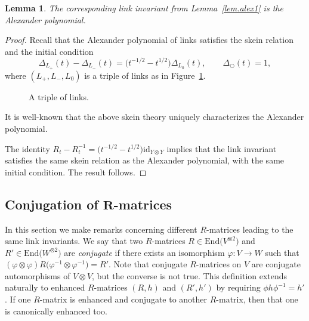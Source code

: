 \documentclass[10pt,a4paper]{amsart}
\numberwithin{equation}{section}
\newtheorem{Lemma}[Theorem]{Lemma}
\theoremstyle{definition}
\begin{document}
\begin{Lemma}\label{lem.alex2}
The corresponding link invariant from Lemma~{\rm \ref{lem.alex1}} is the
Alexander polynomial.
\end{Lemma}

\begin{proof}
Recall that the Alexander polynomial of links satisfies the
skein relation and the initial condition
\begin{equation*}
\Delta_{L_+}(t) - \Delta_{L_-}(t) = \bigl(t^{-1/2} - t^{1/2}\bigr) \Delta_{L_0}(t),
\qquad \Delta_\bigcirc(t) = 1,
\end{equation*}
where $(L_+,L_-,L_0)$ is a triple of links as in Figure~\ref{fig:skein}.

\begin{figure}[htpb!]\centering
{}
\caption{A triple of links.}
\label{fig:skein}
\end{figure}

It is well-known that the above skein theory uniquely characterizes the
Alexander polynomial.

The identity
$R_t - R_t^{-1} = \bigl(t^{-1/2} - t^{1/2}\bigr) \mathrm{id}_{Y \otimes Y}$
implies that the link invariant satisfies the same skein relation as
the Alexander polynomial, with the same initial condition. The result follows.
\end{proof}


\subsection[Conjugation of R-matrices]{Conjugation of $\boldsymbol{R}$-matrices}
\label{sub.conj}

In this section we make remarks concerning different $R$-matrices
leading to the same link invariants.
We say that two $R$-matrices $R \in \mathrm{End}\bigl(V^{\otimes 2}\bigr)$ and
$R' \in \mathrm{End}\bigl(W^{\otimes 2}\bigr)$ are \emph{conjugate} if there exists an isomorphism
$\varphi\colon V \to W$ such that
$
(\varphi \otimes \varphi) R \bigl(\varphi^{-1} \otimes \varphi^{-1}\bigr) = R'$.
Note that conjugate $R$-matrices on $V$ are conjugate automorphisms of $V \otimes V$,
but the converse is not true.
This definition extends naturally to enhanced $R$-matrices $(R,h)$ and $(R',h')$
by requiring $\phi h \phi^{-1} = h'$. If one $R$-matrix is enhanced and
conjugate to another $R$-matrix, then that one is canonically enhanced too.
\end{document}
